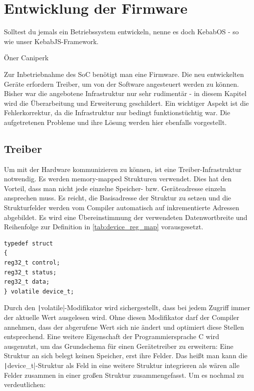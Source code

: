 \chapter{Entwicklung der Firmware}
\label{cha:kebabos}

\epigraph{Solltest du jemals ein Betriebssystem entwickeln, nenne es doch KebabOS - so wie unser KebabJS-Framework.}{Öner Caniperk}

Zur Inbetriebnahme des \gls{SoC} benötigt man eine \gls{Firmware}. Die neu entwickelten Geräte erfordern Treiber, um von der Software angesteuert werden zu können. 
Bisher war die angebotene Infrastruktur nur sehr rudimentär - in diesem Kapitel wird die Überarbeitung und Erweiterung geschildert. Ein wichtiger Aspekt ist die Fehlerkorrektur, da die Infrastruktur nur bedingt funktionstüchtig war. Die aufgetretenen Probleme und ihre Lösung werden hier ebenfalls vorgestellt. 

\section{Treiber}

Um mit der Hardware kommunizieren zu können, ist eine Treiber-Infrastruktur notwendig. Es werden memory-mapped Strukturen verwendet. Dies hat den Vorteil, dass man nicht jede einzelne Speicher- bzw. Geräteadresse einzeln ansprechen muss. Es reicht, die Basisadresse der Struktur zu setzen und die Strukturfelder werden vom Compiler automatisch auf inkrementierte Adressen abgebildet.
Es wird eine Übereinstimmung der verwendeten Datenwortbreite und Reihenfolge zur Definition in \cref{tab:device_reg_map} vorausgesetzt.

\begin{verbatim}
typedef struct
{
reg32_t control;
reg32_t status;
reg32_t data;
} volatile device_t;
\end{verbatim}

Durch den \texttt|volatile|-Modifikator wird sichergestellt, dass bei jedem Zugriff immer der aktuelle Wert ausgelesen wird. Ohne diesen Modifikator darf der Compiler annehmen, dass der abgerufene Wert sich nie ändert und optimiert diese Stellen entsprechend. 
Eine weitere Eigenschaft der Programmiersprache C wird ausgenutzt, um das Grundschema für einen Gerätetreiber zu erweitern: Eine Struktur an sich belegt keinen Speicher, erst ihre Felder. Das heißt man kann die \texttt|device_t|-Struktur als Feld in eine weitere Struktur integrieren als wären alle Felder zusammen in einer großen Struktur zusammengefasst.
Um es nochmal zu verdeutlichen:

